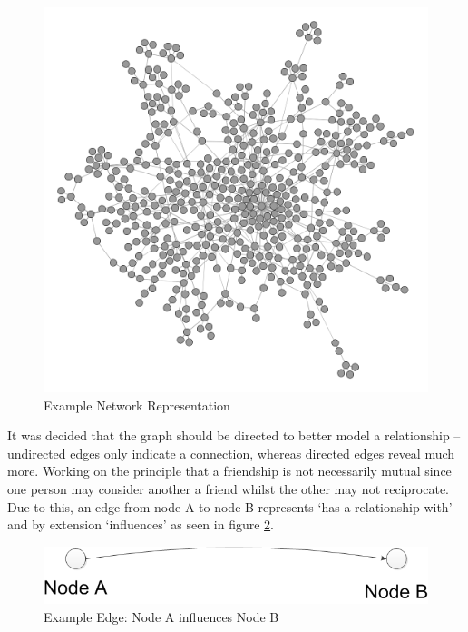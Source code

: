 \documentclass[]{report}
\begin{document}
\begin{figure}
\begin{center}
\includegraphics[scale=0.25]{example-graph.png}
\end{center}
\caption{Example Network Representation}
\label{img:ex-graph}
\end{figure}

It was decided that the graph should be directed to better model a relationship – undirected edges only indicate a connection, whereas directed edges reveal much more. Working on the principle that a friendship is not necessarily mutual since one person may consider another a friend whilst the other may not reciprocate. Due to this, an edge from node A to node B represents `has a relationship with' and by extension `influences' as seen in figure \ref{img:ex-edge}.

\begin{figure}
\begin{center}
\includegraphics[scale=0.5]{example-edge.png}
\end{center}
\caption{Example Edge: Node A influences Node B}
\label{img:ex-edge}
\end{figure}
\end{document}
